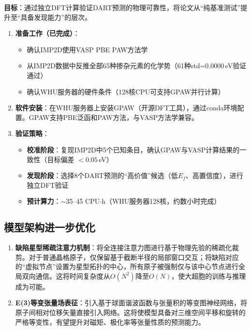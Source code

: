 \textbf{目标}：通过独立DFT计算验证DART预测的物理可靠性，将论文从``纯基准测试''提升至``具备发现能力''的层次。

\begin{enumerate}
    \item \textbf{准备工作（已完成）}：
    \begin{itemize}
        \item 确认IMP2D使用VASP PBE PAW方法学
        \item 从IMP2D数据中反推全部65种掺杂元素的化学势（61种std=0.0000\,eV验证通过）
        \item 确认WHU服务器的硬件条件（128核CPU可支持GPAW并行计算）
    \end{itemize}

    \item \textbf{软件安装}：在WHU服务器上安装GPAW（开源DFT工具），通过conda环境配置。GPAW支持PBE泛函和PAW方法，与VASP方法学兼容。

    \item \textbf{验证策略}：
    \begin{itemize}
        \item \textbf{校准阶段}：复现IMP2D中5个已知条目，确认GPAW与VASP计算结果的一致性（目标偏差 $< 0.05$\,eV）
        \item \textbf{发现阶段}：选择8个DART预测的``高价值''候选（低$E_f$、高置信度），进行独立DFT验证
        \item \textbf{预计算力}：$\sim$35--45 CPU$\cdot$h（WHU服务器128核，约数小时完成）
    \end{itemize}
\end{enumerate}

\subsection{模型架构进一步优化}

\begin{enumerate}
    \item \textbf{缺陷星型稀疏注意力机制}：将全连接注意力图进行基于物理先验的稀疏化裁剪。对于普通晶格原子，仅保留基于截断半径的局部窗口交互；将缺陷对应的``虚拟节点''设置为星型拓扑的中心，所有原子被强制仅与该中心节点进行全局双向通信。这将时间复杂度从$O(N^2)$降至$O(N)$，使大超胞的训练与推理成为可能。

    \item \textbf{E(3)等变张量场表征}：引入基于球面谐波函数与张量积的等变图神经网络，将原子间相对位移矢量直接引入网络。这将使模型具备对三维空间平移和旋转的严格等变性，有望提升对磁矩、极化率等张量性质的预测能力。
\end{enumerate}

